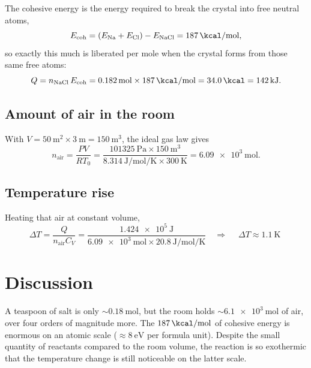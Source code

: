 \documentclass[11pt]{article}
\begin{document}
The cohesive energy is the energy required to break the crystal into free
neutral atoms,
\begin{equation}
  E_\text{coh} = \left(E_\text{Na} + E_\text{Cl}\right) - E_\text{NaCl}
  = \qty{187}{\kcal\per\mole},
  \label{eq:ecoh}
\end{equation}
so exactly this much is liberated per mole when the crystal forms from those
same free atoms:
\begin{equation}
  Q = n_\text{NaCl}\,E_\text{coh}
  = \qty{0.182}{\mole} \times \qty{187}{\kcal\per\mole}
  = \qty{34.0}{\kcal} = \qty{142}{\kilo\joule}.
  \label{eq:Q}
\end{equation}

\subsection{Amount of air in the room}

With $V = \qty{50}{\meter\squared} \times \qty{3}{\meter} =
\qty{150}{\cubic\meter}$, the ideal gas law gives~\cite{codata}
\begin{equation}
  n_\text{air} = \frac{PV}{RT_0}
  = \frac{\qty{101325}{\pascal} \times \qty{150}{\cubic\meter}}
         {\qty{8.314}{\joule\per\mole\per\kelvin} \times \qty{300}{\kelvin}}
  = \qty{6.09e3}{\mole}.
  \label{eq:nair}
\end{equation}

\subsection{Temperature rise}

Heating that air at constant volume,
\begin{equation}
  \Delta T = \frac{Q}{n_\text{air} C_V}
  = \frac{\qty{1.424e5}{\joule}}
         {\qty{6.09e3}{\mole} \times \qty{20.8}{\joule\per\mole\per\kelvin}}
  \quad\Longrightarrow\quad
  \boxed{\;\Delta T \approx \qty{1.1}{\kelvin}\;}
  \label{eq:answer}
\end{equation}

\section{Discussion}

A teaspoon of salt is only $\sim\!\qty{0.18}{\mole}$, but the room holds
$\sim\!\qty{6.1e3}{\mole}$ of air, over four orders of magnitude more. The
$\qty{187}{\kcal\per\mole}$ of cohesive energy is enormous on an atomic scale
($\approx\qty{8}{\electronvolt}$ per formula unit). Despite the small quantity
of reactants compared to the room volume, the reaction is so exothermic that the
temperature change is still noticeable on the latter scale.
\end{document}
